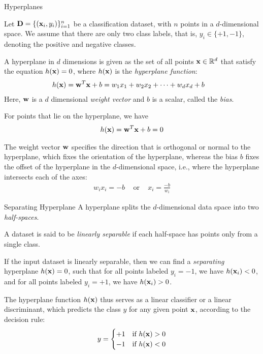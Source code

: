 
\date{Chapter 21: Support Vector Machines}

\begin{frame}
\titlepage
\end{frame}



\begin{frame}{Hyperplanes}

Let $\mathbf{D} = \{ (\mathbf{x}_i, y_i) \}_{i=1}^n$ be a classif\/{i}cation
dataset, with $n$ points in a $d$-dimensional space. We 
assume that there are only two class labels, that is, $y_i \in
\{+1, -1\}$, denoting the positive and negative classes.

\medskip
A hyperplane in $d$ dimensions is given as the set of all points $\mathbf{x}
\in {\mathord{\mathbb R}}^d$ that satisfy the equation
  $h(\mathbf{x}) = 0$,
  where $h(\mathbf{x})$ is the {\em hyperplane function}:
\begin{align*}
h(\mathbf{x}) & =  \mathbf{w}^{T}\mathbf{x}+b 
=  w_1x_1 + w_2x_2 + \cdots + w_dx_d + b
\end{align*}
Here, $\mathbf{w}$ is a $d$ dimensional {\em weight vector} and $b$ is a
scalar, called the {\em bias}.

\medskip
For points that lie on the hyperplane, we have
\begin{align*}
  h(\mathbf{x}) = \mathbf{w}^T\mathbf{x}+b = 0
\end{align*}

\medskip
The weight
vector $\mathbf{w}$ specif\/{i}es the direction that is orthogonal or 
normal to the
hyperplane, which f\/{i}xes the orientation of the hyperplane, whereas
the bias $b$ f\/{i}xes the offset of the hyperplane in the $d$-dimensional
space, i.e., where
the hyperplane intersects each of the axes:
\begin{align*}
  w_ix_i = -b \;\;\;\mbox{ or }\;\;\; x_i = \frac{-b}{w_i}
\end{align*}
\end{frame}



\begin{frame}{Separating Hyperplane}
A hyperplane splits the $d$-dimensional data space
into two {\em half-spaces}. 

\medskip
A dataset is said to be {\em linearly
separable} if each half-space has points only from a single class.

\medskip
If the input
dataset is linearly separable, then we can f\/{i}nd a {\em separating}
hyperplane $h(\mathbf{x})=0$, such that for all points labeled $y_i=-1$, we have
$h(\mathbf{x}_i) < 0$, and for all points labeled $y_i = +1$, we have
$h(\mathbf{x}_i) > 0$. 

\medskip
The hyperplane function $h(\mathbf{x})$ thus serves as a 
linear classif\/{i}er or a linear discriminant,
which predicts the class $y$ for any given point $\mathbf{x}$,  according to
the decision rule:
\begin{align*}
  y =
  \begin{cases}
    +1 & \mbox{if } h(\mathbf{x}) > 0\\
    -1 & \mbox{if } h(\mathbf{x}) < 0
  \end{cases}
\end{align*}
\end{frame}


